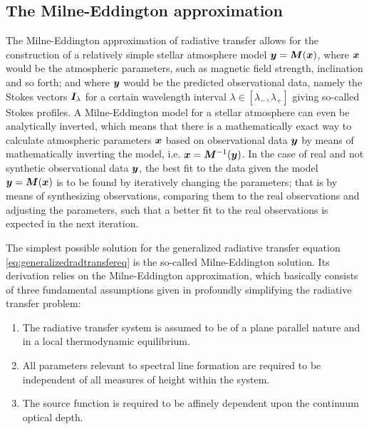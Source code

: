 \documentclass[a4paper,11pt]{report}
\begin{document}
\subsection{The Milne-Eddington approximation}\label{sec:MEapproximation}
The Milne-Eddington approximation of radiative transfer allows for the construction of a relatively simple stellar atmosphere model $\bm{y} = \bm{M}(\bm{x})$, where $\bm{x}$ would be the atmospheric parameters, such as  magnetic field strength, inclination and so forth; and where $\bm{y}$ would be the predicted observational data, namely the Stokes vectors $\bm{I}_\lambda$ for a certain wavelength interval $\lambda \in [\lambda_-,\lambda_+]$ giving so-called Stokes profiles. A Milne-Eddington model for a stellar atmosphere can even be analytically inverted, which means that there is a mathematically exact way to calculate atmospheric parameters $\bm{x}$ based on observational data $\bm{y}$ by means of mathematically inverting the model, i.e. $\bm{x} = \bm{M}^{-1}(\bm{y})$. In the case of real and not synthetic observational data $\bm{y}$, the best fit to the data given the model $\bm{y} = \bm{M}(\bm{x})$ is to be found by iteratively changing the parameters; that is by means of synthesizing observations, comparing them to the real observations and adjusting the parameters, such that a better fit to the real observations is expected in the next iteration.

The simplest possible solution for the generalized radiative transfer equation \cref{eq:generalizedradtransfereq} is the so-called Milne-Eddington solution. Its derivation relies on the Milne-Eddington approximation, which basically consists of three fundamental assumptions given in \cite[p.411]{DeglInnocenti.2005} profoundly simplifying the radiative transfer problem:
\begin{enumerate}
\item The radiative transfer system is assumed to be of a plane parallel nature and in a local thermodynamic equilibrium.
\item All parameters relevant to spectral line formation are required to be independent of all measures of height within the system.
\item The source function is required to be affinely dependent upon the continuum optical depth.
\end{enumerate}
\end{document}
